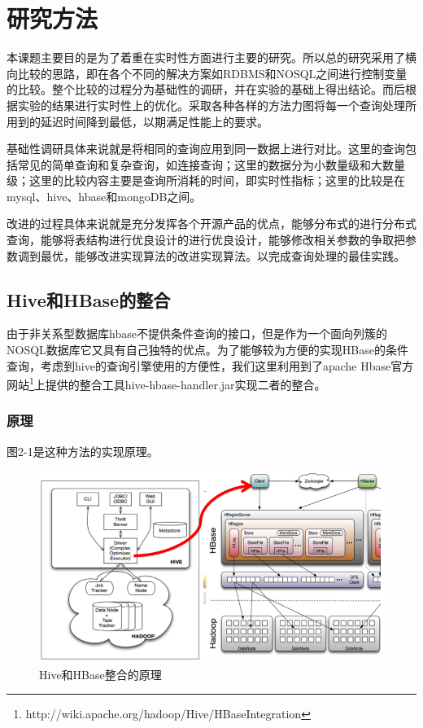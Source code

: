 \chapter{研究方法}
  本课题主要目的是为了着重在实时性方面进行主要的研究。所以总的研究采用了横向比较的思路，即在各个不同的解决方案如RDBMS和NOSQL之间进行控制变量的比较。整个比较的过程分为基础性的调研，并在实验的基础上得出结论。而后根据实验的结果进行实时性上的优化。采取各种各样的方法力图将每一个查询处理所用到的延迟时间降到最低，以期满足性能上的要求。


  基础性调研具体来说就是将相同的查询应用到同一数据上进行对比。这里的查询包括常见的简单查询和复杂查询，如连接查询；这里的数据分为小数量级和大数量级；这里的比较内容主要是查询所消耗的时间，即实时性指标；这里的比较是在mysql、hive、hbase和mongoDB之间。

  
  改进的过程具体来说就是充分发挥各个开源产品的优点，能够分布式的进行分布式查询，能够将表结构进行优良设计的进行优良设计，能够修改相关参数的争取把参数调到最优，能够改进实现算法的改进实现算法。以完成查询处理的最佳实践。


\section{Hive和HBase的整合}
  由于非关系型数据库hbase不提供条件查询的接口，但是作为一个面向列簇的NOSQL数据库它又具有自己独特的优点。为了能够较为方便的实现HBase的条件查询，考虑到hive的查询引擎使用的方便性，我们这里利用到了apache Hbase官方网站\footnote{http://wiki.apache.org/hadoop/Hive/HBaseIntegration
}上提供的整合工具hive-hbase-handler.jar实现二者的整合。

\subsection{原理}
图2-1是这种方法的实现原理。


\begin{figure}[!ht]
\centering
\includegraphics[scale=0.8]{photo/hive-hbase.PNG} 
\caption{Hive和HBase整合的原理}
\end{figure} 


